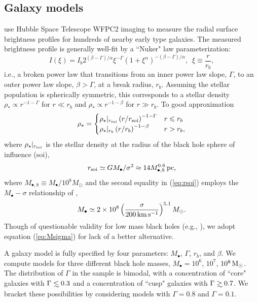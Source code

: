 \documentclass[usenatbib,fleqn]{mn2e}
\newcommand\lsim{\mathrel{\rlap{\lower4pt\hbox{\hskip1pt$\sim$}}
    \raise1pt\hbox{$<$}}}
\newcommand\gsim{\mathrel{\rlap{\lower4pt\hbox{\hskip1pt$\sim$}}
    \raise1pt\hbox{$>$}}}
\newcommand{\rb}{r_b}
\newcommand{\rhostar}{\rho_*}
\newcommand{\Mbh}[1][]{M_{\bullet#1}}
\newcommand{\soi}{\rm soi}
\newcommand{\rsoi}{r_{\soi}}
\begin{document}
\subsection{Galaxy models}
\label{sec:gal_model}
\citet{LauerFaber+:2007a} use Hubble Space Telescope WFPC2 imaging to
measure the radial surface brightness profiles for hundreds of nearby
early type galaxies. The measured brightness profile is generally
well-fit by a ``Nuker" law parameterization:
\begin{equation}
  I(\xi)=I_b 2^{(\beta-\Gamma)/\alpha} \xi^{-\Gamma} (1+\xi^\alpha)^{-(\beta-\Gamma)/\alpha}, \,\,\,\xi\equiv\frac{r}{r_b},
\end{equation}
i.e., a broken power law that transitions from an inner power law
slope, $\Gamma$, to an outer power law slope, $\beta > \Gamma$, at a
break radius, $\rb$.  Assuming the stellar population is spherically
symmetric, this corresponds to a stellar density $\rhostar \propto
r^{-1-\Gamma}$ for $r \ll \rb$ and $\rhostar\propto r^{-1-\beta}$ for
$r \gg \rb$.  To good approximation
\begin{align}
\rho_\star = 
\begin{cases}
\rho_\star|_{\rsoi} \left(r/\rsoi\right)^{-1-\Gamma} & r \leq r_b\\
\rho_\star|_{r_b} \left(r/r_b\right)^{-1-\beta} & r > r_b,
\label{eq:rhostar}
\end{cases}
\end{align}
where $\rho_\star|_{\rsoi}$ is the stellar density at the radius of the black hole sphere of influence (soi), 
\begin{equation}
\rsoi \simeq G \Mbh/\sigma^2 \approx 14 M_{\bullet,8}^{0.6}\,{\rm pc},
\label{eq:rsoi}
\end{equation}
where $M_{\bullet,8} \equiv M_{\bullet}/10^{8}M_{\odot}$ and the
second equality in (\ref{eq:rsoi}) employs the $\Mbh-\sigma$
relationship of \citet{McConnellMa+:2011a},
 \begin{align}
M_{\bullet} \simeq 2\times 10^{8}\left(\frac{\sigma}{200\,{\rm
      km\,s^{-1}}}\right)^{5.1}M_{\odot}.
\label{eq:Msigma}
\end{align}
Though of questionable validity for low mass black holes (e.g., \citealt{Greene&Ho07}), we adopt equation (\ref{eq:Msigma}) for lack of a better alternative.

A galaxy model is fully specified by four parameters: $\Mbh$,
$\Gamma$, $r_b$, and $\beta$.  We compute models for three different
black hole masses, $\Mbh = 10^6$, $10^7$, $10^8 \,{\rm M_\odot}$.  The
distribution of $\Gamma$ in the \citet{LauerFaber+:2007a} sample is
bimodal, with a concentration of ``core" galaxies with $\Gamma \lsim
0.3$ and a concentration of ``cusp" galaxies with $\Gamma \gsim 0.7$.
We bracket these possibilities by considering models with $\Gamma=0.8$
and $\Gamma=0.1$.  
\end{document}
